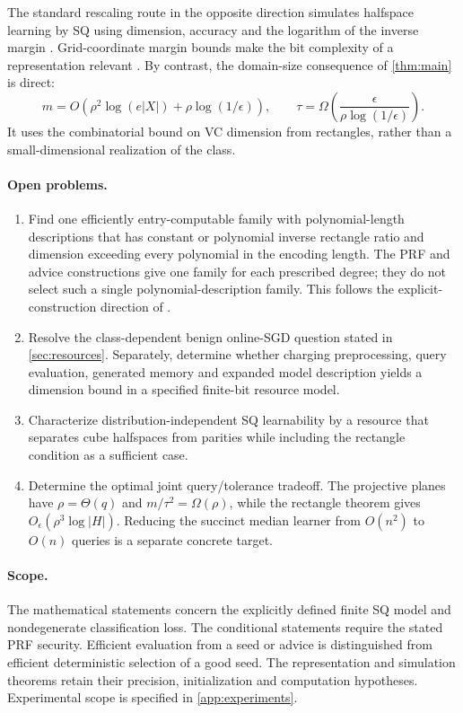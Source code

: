 The standard rescaling route in the opposite direction simulates halfspace learning by SQ using dimension, accuracy and the logarithm of the inverse margin \citep{DV04,BF13}. Grid-coordinate margin bounds make the bit complexity of a representation relevant \citep{GSS13}. By contrast, the domain-size consequence of \cref{thm:main} is direct:
\[
 m=O\!\left(\rho^2\log(e|X|)+\rho\log(1/\epsilon)\right),\qquad
 \tau=\Omega\!\left(\frac{\epsilon}{\rho\log(1/\epsilon)}\right).
\]
It uses the combinatorial bound on VC dimension from rectangles, rather than a small-dimensional realization of the class.

\paragraph{Open problems.}
\begin{enumerate}[leftmargin=*,itemsep=3pt]
\item Find one efficiently entry-computable family with polynomial-length descriptions that has constant or polynomial inverse rectangle ratio and dimension exceeding every polynomial in the encoding length. The PRF and advice constructions give one family for each prescribed degree; they do not select such a single polynomial-description family. This follows the explicit-construction direction of \citet[Problem~4.1]{HHPTZ22}.
\item Resolve the class-dependent benign online-SGD question stated in \cref{sec:resources}. Separately, determine whether charging preprocessing, query evaluation, generated memory and expanded model description yields a dimension bound in a specified finite-bit resource model.
\item Characterize distribution-independent SQ learnability by a resource that separates cube halfspaces from parities while including the rectangle condition as a sufficient case.
\item Determine the optimal joint query/tolerance tradeoff. The projective planes have $\rho=\Theta(q)$ and $m/\tau^2=\Omega(\rho)$, while the rectangle theorem gives $O_\epsilon(\rho^3\log|H|)$. Reducing the succinct median learner from $O(n^2)$ to $O(n)$ queries is a separate concrete target.
\end{enumerate}

\paragraph{Scope.}
The mathematical statements concern the explicitly defined finite SQ model and nondegenerate classification loss. The conditional statements require the stated PRF security. Efficient evaluation from a seed or advice is distinguished from efficient deterministic selection of a good seed. The representation and simulation theorems retain their precision, initialization and computation hypotheses. Experimental scope is specified in \cref{app:experiments}.
